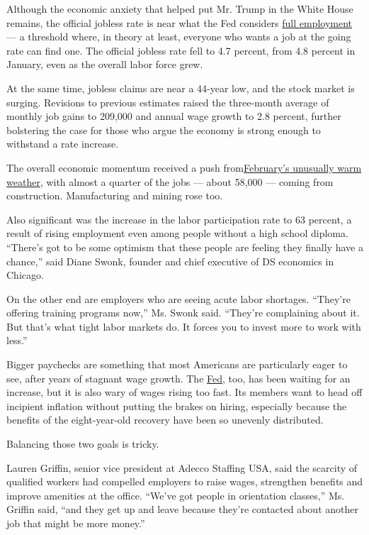 Although the economic anxiety that helped put Mr. Trump in the White
House remains, the official jobless rate is near what the Fed considers
\href{http://www.economist.com/blogs/economist-explains/2017/01/economist-explains-19}{full
employment} --- a threshold where, in theory at least, everyone who
wants a job at the going rate can find one. The official jobless rate
fell to 4.7 percent, from 4.8 percent in January, even as the overall
labor force grew.

At the same time, jobless claims are near a 44-year low, and the stock
market is surging. Revisions to previous estimates raised the
three-month average of monthly job gains to 209,000 and annual wage
growth to 2.8 percent, further bolstering the case for those who argue
the economy is strong enough to withstand a rate increase.

The overall economic momentum received a push
from\href{https://www.nytimes.com/2017/02/24/nyregion/warm-weather-hurts-winter-businesses.html}{February's
unusually warm weather}, with almost a quarter of the jobs --- about
58,000 --- coming from construction. Manufacturing and mining rose too.

Also significant was the increase in the labor participation rate to 63
percent, a result of rising employment even among people without a high
school diploma. ``There's got to be some optimism that these people are
feeling they finally have a chance,'' said Diane Swonk, founder and
chief executive of DS economics in Chicago.

On the other end are employers who are seeing acute labor shortages.
``They're offering training programs now,'' Ms. Swonk said. ``They're
complaining about it. But that's what tight labor markets do. It forces
you to invest more to work with less.''

Bigger paychecks are something that most Americans are particularly
eager to see, after years of stagnant wage growth. The
\href{https://www.nytimes.com/2017/03/03/business/economy/federal-reserve-interest-rates.html}{Fed},
too, has been waiting for an increase, but it is also wary of wages
rising too fast. Its members want to head off incipient inflation
without putting the brakes on hiring, especially because the benefits of
the eight-year-old recovery have been so unevenly distributed.

Balancing those two goals is tricky.

Lauren Griffin, senior vice president at Adecco Staffing USA, said the
scarcity of qualified workers had compelled employers to raise wages,
strengthen benefits and improve amenities at the office. ``We've got
people in orientation classes,'' Ms. Griffin said, ``and they get up and
leave because they're contacted about another job that might be more
money.''

